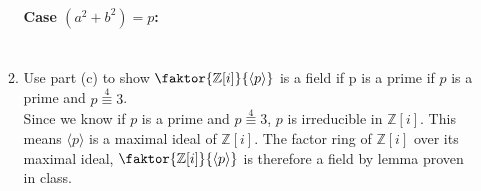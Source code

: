\documentclass[12pt]{article}
\begin{document}
\begin{enumerate}
\begin{enumerate}
				\paragraph{Case $(a^2 + b^2)=p$:}
				\begin{align*}
				\end{align*}

			\item Use part (c) to show $\faktor{\mathbb{Z}[i]}{\langle p \rangle}$
				is a field if p is a prime if $p$ is a prime and $p \overset{4}{\equiv}
				3$.\\
				Since we know if $p$ is a prime and $p \overset{4}{\equiv} 3$, $p$ is
				irreducible in $\mathbb{Z}[i]$. This means $\langle p \rangle$ is a
				maximal ideal of $\mathbb{Z}[i]$. The factor ring of $\mathbb{Z}[i]$
				over its maximal ideal, $\faktor{\mathbb{Z}[i]}{\langle p \rangle}$ is
				therefore a field by lemma proven in class.
		\end{enumerate}
\end{enumerate}
\end{document}
